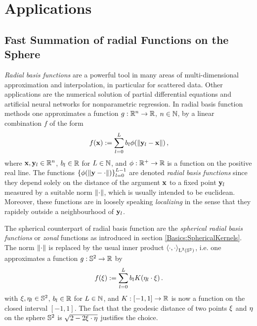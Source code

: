 \chapter{Applications}
\label{Applications}

\section{Fast Summation of radial Functions on the Sphere}
\label{Applications:FastSum}
\emph{Radial basis functions} are a powerful tool in many areas of multi-dimensional 
approximation and interpolation, in particular for scattered data. Other applications
are the numerical solution of partial differential equations and artificial neural networks 
for nonparametric regression.
In radial basis function methods one approximates a function $g: \mathbb{R}^n
\rightarrow \mathbb{R}$, $n \in \mathbb{N}$, by a linear combination $f$ of the form
\begin{equation}
  \nonumber
  f{\hspace{-0.4ex}}\left(\mathbf{x}\right) := \sum_{l=0}^L b_{l} \phi{\hspace{-0.4ex}}\left(\left\|\mathbf{y}_{l}-\mathbf{x}\right\|\right),
\end{equation}
where $\mathbf{x}, \mathbf{y}_{l} \in \mathbb{R}^n$, $b_{l} \in \mathbb{R}$ for $L \in \mathbb{N}$, and 
$\phi: \mathbb{R}^{+} \rightarrow \mathbb{R}$ is a function on the positive real line. 
The functions $\left\{\phi{\hspace{-0.4ex}}\left(\left\|\mathbf{y}-\cdot\right\|\right)\right\rbrace_{l=0}^{L-1}$ are
denoted \emph{radial basis functions} since they depend solely on 
the distance of the argument $\mathbf{x}$ to a fixed point $\mathbf{y}_{l}$ measured 
by a suitable norm $\left\|\cdot\right\|$, which is usually intended to be euclidean.
Moreover, these functions are in loosely speaking \emph{localizing} in the sense 
that they rapidely outside a neighbourhood of $\mathbf{y}_{l}$.

The spherical counterpart of radial basis function are the \emph{spherical radial basis functions} or \emph{zonal} functions as introduced in section 
\ref{Basics:SphericalKernels}. The norm $\left\|\cdot\right\|$ is replaced by the usual
inner product $\left<\cdot,\cdot\right>_{\text{\rm{L}}^{2}\left(\mathbb{S}^2\right)}$, i.e. one
approximates a function $g: \mathbb{S}^2 \rightarrow \mathbb{R}$ by
\begin{equation}
  \label{Applications:ZonalSum}
  f{\hspace{-0.4ex}}\left(\mathbf{\xi}\right) := \sum_{l=0}^L b_{l} K{\hspace{-0.4ex}}\left(\mathbf{\eta}_{l}\cdot\mathbf{\xi}\right).
\end{equation}
with $\mathbf{\xi}, \mathbf{\eta}_{l} \in \mathbb{S}^2$, $b_{l} \in \mathbb{R}$ for $L \in \mathbb{N}$, and 
$K: [-1,1] \rightarrow \mathbb{R}$ is now a function on the closed interval $[-1,1]$. 
The fact that the geodesic distance of two points $\mathbf{\xi}$ and $\mathbf{\eta}$ on the 
sphere $\mathbb{S}^2$ is $\sqrt{2-2\mathbf{\xi}\cdot\mathbf{\eta}}$ justifies the choice.

